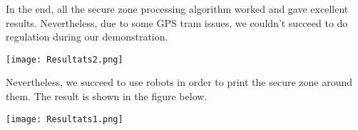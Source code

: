 In the end, all the secure zone processing algorithm worked and gave excellent results. Nevertheless, due to some GPS tram issues, we couldn't succeed to do regulation during our demonstration.


\begin{center}
\texttt{[image: Resultats2.png]} 
\label{resultats2}
\end{center}

Nevertheless, we succeed to use robots in order to print the secure zone around them. The result is shown in the figure below.

\begin{center}
\texttt{[image: Resultats1.png]} 
\label{Resultats1}
\end{center}